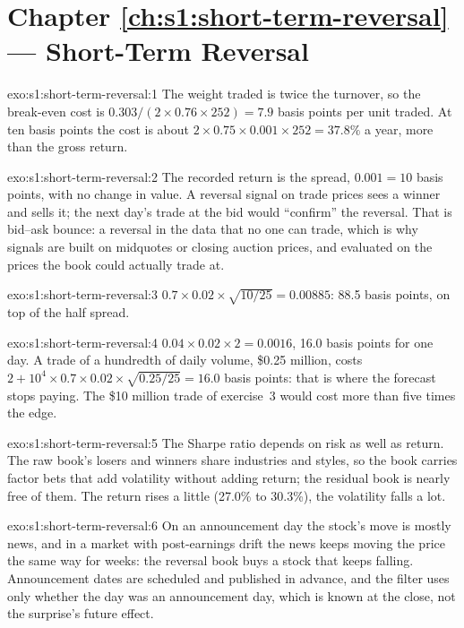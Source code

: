 \section*{Chapter \ref{ch:s1:short-term-reversal} --- Short-Term Reversal}

\begin{solution}{exo:s1:short-term-reversal:1}
The weight traded is twice the turnover, so the break-even cost is $0.303/(2 \times 0.76 \times 252) = 7.9$ basis points per unit traded. At ten basis
points the cost is about $2 \times 0.75 \times 0.001 \times 252 = 37.8\%$ a year, more than the gross return.
\end{solution}

\begin{solution}{exo:s1:short-term-reversal:2}
The recorded return is the spread, $0.001 = 10$ basis points, with no change in value. A reversal signal on trade prices sees a winner and sells it; the next
day's trade at the bid would ``confirm'' the reversal. That is bid--ask bounce: a reversal in the data that no one can trade, which is why signals are built on
midquotes or closing auction prices, and evaluated on the prices the book could actually trade at.
\end{solution}

\begin{solution}{exo:s1:short-term-reversal:3}
$0.7 \times 0.02 \times \sqrt{10/25} = 0.00885$: 88.5 basis points, on top of the half spread.
\end{solution}

\begin{solution}{exo:s1:short-term-reversal:4}
$0.04 \times 0.02 \times 2 = 0.0016$, 16.0 basis points for one day. A trade of a hundredth of daily volume, \$0.25 million, costs
$2 + 10^4 \times 0.7 \times 0.02 \times \sqrt{0.25/25} = 16.0$ basis points: that is where the forecast stops paying. The \$10 million trade of exercise~3 would
cost more than five times the edge.
\end{solution}

\begin{solution}{exo:s1:short-term-reversal:5}
The Sharpe ratio depends on risk as well as return. The raw book's losers and winners share industries and styles, so the book carries factor bets that add
volatility without adding return; the residual book is nearly free of them. The return rises a little (27.0\% to 30.3\%), the volatility falls a lot.
\end{solution}

\begin{solution}{exo:s1:short-term-reversal:6}
On an announcement day the stock's move is mostly news, and in a market with post-earnings drift the news keeps moving the price the same way for weeks: the
reversal book buys a stock that keeps falling. Announcement dates are scheduled and published in advance, and the filter uses only whether the day was an
announcement day, which is known at the close, not the surprise's future effect.
\end{solution}

